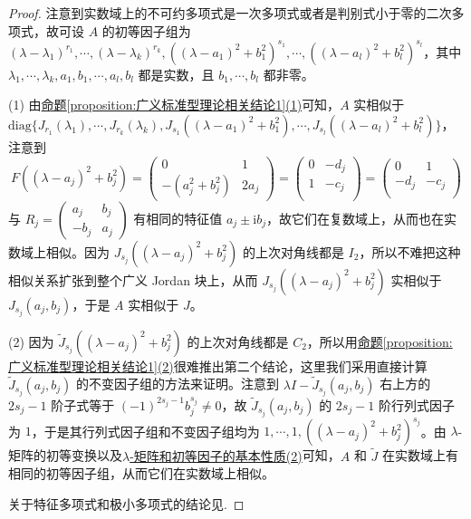 \documentclass[../../main.tex]{subfiles}%
\begin{document}
\begin{proof}

注意到实数域上的不可约多项式是一次多项式或者是判别式小于零的二次多项式，故可设 $A$ 的初等因子组为 $(\lambda - \lambda_1)^{r_1},\cdots,(\lambda - \lambda_k)^{r_k},((\lambda - a_1)^2 + b_1^2)^{s_1},\cdots,((\lambda - a_l)^2 + b_l^2)^{s_l}$，其中 $\lambda_1,\cdots,\lambda_k,a_1,b_1,\cdots,a_l,b_l$ 都是实数，且 $b_1,\cdots,b_l$ 都非零。

(1) 由\hyperref[proposition:广义标准型理论相关结论1]{命题\ref{proposition:广义标准型理论相关结论1}(1)}可知，$A$ 实相似于 $\mathrm{diag}\{J_{r_1}(\lambda_1),\cdots,J_{r_k}(\lambda_k),J_{s_1}((\lambda - a_1)^2 + b_1^2),\cdots,J_{s_l}((\lambda - a_l)^2 + b_l^2)\}$，注意到 
$$
F((\lambda - a_j)^2 + b_j^2) = \begin{pmatrix}0 & 1 \\ -(a_j^2 + b_j^2) & 2a_j\end{pmatrix}=\left( \begin{matrix}
0&		-d_j\\
1&		-c_j\\
\end{matrix} \right) =\left( \begin{matrix}
0&		1\\
-d_j&		-c_j\\
\end{matrix} \right) 
$$
与 $R_j = \begin{pmatrix}a_j & b_j \\ -b_j & a_j\end{pmatrix}$ 有相同的特征值 $a_j\pm \mathrm{i}b_j$，故它们在复数域上，从而也在实数域上相似。因为 $J_{s_j}((\lambda - a_j)^2 + b_j^2)$ 的上次对角线都是 $I_2$，所以不难把这种相似关系扩张到整个广义 Jordan 块上，从而 $J_{s_j}((\lambda - a_j)^2 + b_j^2)$ 实相似于 $J_{s_j}(a_j,b_j)$，于是 $A$ 实相似于 $J$。

(2) 因为 $\widetilde{J}_{s_j}((\lambda - a_j)^2 + b_j^2)$ 的上次对角线都是 $C_2$，所以用\hyperref[proposition:广义标准型理论相关结论1]{命题\ref{proposition:广义标准型理论相关结论1}(2)}很难推出第二个结论，这里我们采用直接计算 $\widetilde{J}_{s_j}(a_j,b_j)$ 的不变因子组的方法来证明。注意到 $\lambda I - \widetilde{J}_{s_j}(a_j,b_j)$ 右上方的 $2s_j - 1$ 阶子式等于 $(-1)^{2s_j - 1}b_j^{s_j}\neq 0$，故 $\widetilde{J}_{s_j}(a_j,b_j)$ 的 $2s_j - 1$ 阶行列式因子为 $1$，于是其行列式因子组和不变因子组均为 $1,\cdots,1,((\lambda - a_j)^2 + b_j^2)^{s_j}$。由 $\lambda$-矩阵的初等变换以及\hyperref[theorem:lambda-矩阵和初等因子的基本性质]{$\lambda$-矩阵和初等因子的基本性质(2)}可知，$A$ 和 $\widetilde{J}$ 在实数域上有相同的初等因子组，从而它们在实数域上相似。

关于特征多项式和极小多项式的结论见.

\end{proof}
\end{document}
